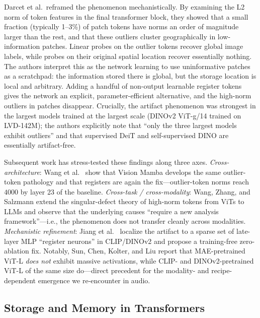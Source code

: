 \documentclass[conference]{IEEEtran}
\begin{document}
Darcet et al.\ reframed the phenomenon mechanistically. By examining the L2 norm of token features in the final transformer block, they showed that a small fraction (typically 1--3\%) of patch tokens have norms an order of magnitude larger than the rest, and that these outliers cluster geographically in low-information patches. Linear probes on the outlier tokens recover global image labels, while probes on their original spatial location recover essentially nothing. The authors interpret this as the network learning to use uninformative patches as a scratchpad: the information stored there is global, but the storage location is local and arbitrary. Adding a handful of non-output learnable register tokens gives the network an explicit, parameter-efficient alternative, and the high-norm outliers in patches disappear. Crucially, the artifact phenomenon was strongest in the largest models trained at the largest scale (DINOv2 ViT-g/14 trained on LVD-142M); the authors explicitly note that ``only the three largest models exhibit outliers'' and that supervised DeiT and self-supervised DINO are essentially artifact-free.

Subsequent work has stress-tested these findings along three axes. \emph{Cross-architecture}: Wang et al.\ \cite{wang2024mambar} show that Vision Mamba develops the same outlier-token pathology and that registers are again the fix---outlier-token norms reach $4000$ by layer 23 of the baseline. \emph{Cross-task / cross-modality}: Wang, Zhang, and Salzmann \cite{wang2025singular} extend the singular-defect theory of high-norm tokens from ViTs to LLMs and observe that the underlying causes ``require a new analysis framework''---i.e., the phenomenon does not transfer cleanly across modalities. \emph{Mechanistic refinement}: Jiang et al.\ \cite{jiang2025notrained} localize the artifact to a sparse set of late-layer MLP ``register neurons'' in CLIP/DINOv2 and propose a training-free zero-ablation fix. Notably, Sun, Chen, Kolter, and Liu \cite{sun2024massive} report that MAE-pretrained ViT-L \emph{does not} exhibit massive activations, while CLIP- and DINOv2-pretrained ViT-L of the same size do---direct precedent for the modality- and recipe-dependent emergence we re-encounter in audio.

\subsection{Storage and Memory in Transformers}
\end{document}

